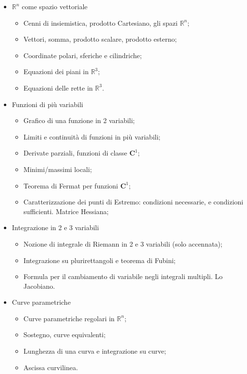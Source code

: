 \documentclass{article}
\begin{document}
\begin{itemize}

\item {\large $\mathbb{R}^n$ come spazio vettoriale}
 \begin{itemize}
    \item Cenni di insiemistica, prodotto Cartesiano,
          gli spazi $\mathbb{R}^n$;
    \item Vettori, somma, prodotto scalare, prodotto esterno;
    \item Coordinate polari, sferiche e cilindriche;
    \item Equazioni dei piani in $\mathbb{R}^3$;
    \item Equazioni delle rette in $\mathbb{R}^3$. 
 \end{itemize}

\item {\large Funzioni di pi\`u variabili}
 \begin{itemize}
    \item Grafico di una funzione in 2 variabili;
    \item Limiti e continuit\`a di funzioni in pi\`u variabili;
    \item Derivate parziali, funzioni di classe $\mathbf{C}^{1}$;
    \item Minimi/massimi locali;
    \item Teorema di Fermat per funzioni $\mathbf{C}^{1}$;
    \item Caratterizzazione dei punti di Estremo:
          condizioni necessarie, e condizioni sufficienti.
          Matrice Hessiana;

 \end{itemize}

\item {\large Integrazione in 2 e 3 variabili}
 \begin{itemize}
    \item Nozione di integrale di Riemann in 2 e 3 variabili (solo accennata);
    \item Integrazione su plurirettangoli e teorema di Fubini;
    \item Formula per il cambiamento di variabile
          negli integrali multipli. Lo Jacobiano.
 \end{itemize}

\item {\large Curve parametriche}
 \begin{itemize}
    \item Curve parametriche regolari in $\mathbb{R}^{n}$;
    \item Sostegno, curve equivalenti;
    \item Lunghezza di una curva e integrazione su curve;
    \item Ascissa curvilinea.
 \end{itemize}


\end{itemize}
\end{document}
